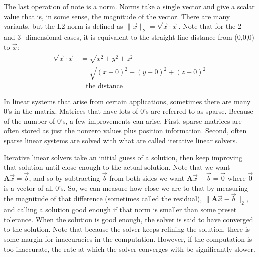 \documentclass[12pt,]{article}
\newcommand{\mat}[1]{\mathbf{#1}}
\begin{document}
The last operation of note is a norm.
Norms take a single vector and give a scalar value that is, in some sense, the magnitude of the vector.
There are many variants, but the L2 norm is defined as \(\|\vec{x}\|_2 = \sqrt{\vec{x}\cdot\vec{x}}\).
Note that for the 2- and 3- dimensional cases, it is equivalent to the straight line distance from (0,0,0) to \(\vec{x}\):
\begin{equation}
	\begin{aligned}
		\sqrt{\vec{x}\cdot\vec{x}}
		&= \sqrt{x^2+y^2+z^2} \\
		&= \sqrt{(x-0)^2 + (y-0)^2 + (z-0)^2} \\
		&= \text{the distance}
	\end{aligned}
\end{equation}


In linear systems that arise from certain applications, sometimes there are many 0's in the matrix.
Matrices that have lots of 0's are referred to as sparse.
Because of the number of 0's, a few improvements can arise.
First, sparse matrices are often stored as just the nonzero values plus position information.
Second, often sparse linear systems are solved with what are called iterative linear solvers.

Iterative linear solvers take an initial guess of a solution, then keep improving that solution until close enough to the actual solution.
Note that we want \(\mat{A}\vec{x} = \vec{b}\), and so by subtracting \(\vec{b}\) from both sides we want \(\mat{A}\vec{x} - \vec{b} = \vec{0}\) where \(\vec{0}\) is a vector of all 0's.
So, we can measure how close we are to that by measuring the magnitude of that difference (sometimes called the residual), \(\|\mat{A}\vec{x} - \vec{b}\|_2\), and calling a solution good enough if that norm is smaller than some preset tolerance.
When the solution is good enough, the solver is said to have converged to the solution.
Note that because the solver keeps refining the solution, there is some margin for inaccuracies in the computation.
However, if the computation is too inaccurate, the rate at which the solver converges with be significantly slower.


\fi
\end{document}
